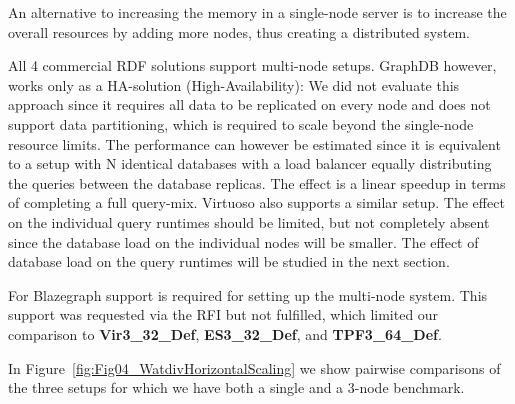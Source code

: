 An alternative to increasing the memory in a single-node server is to increase the overall resources by 
adding more nodes, thus creating a distributed system. 

All 4 commercial RDF solutions support multi-node setups. GraphDB however, works only as a HA-solution (High-Availability): We did not evaluate this approach since 
it requires all data to be replicated on every node and does not support data partitioning, which is required to scale beyond the single-node resource limits.
The performance can however be estimated since it is equivalent to a setup with N identical databases with a load balancer equally distributing the queries between
the database replicas. The effect is a linear speedup in terms of completing a full query-mix. 
Virtuoso also supports a similar setup.
The effect on the individual query runtimes should be limited, but not completely absent since the database load on the individual nodes will be smaller. The effect of database load on the query runtimes will be studied in the next section.


For Blazegraph support is required for setting up the multi-node system. This support was requested via the RFI but not fulfilled, which limited our comparison to \textbf{Vir3\_32\_Def}, \textbf{ES3\_32\_Def}, and \textbf{TPF3\_64\_Def}.

In Figure~\ref{fig:Fig04_WatdivHorizontalScaling} we show pairwise comparisons of the three setups for which we have both a single and a 3-node benchmark. 

